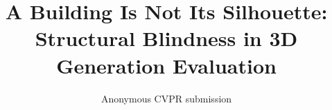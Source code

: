 \documentclass[10pt,twocolumn,letterpaper]{article}
\title{A Building Is Not Its Silhouette: Structural Blindness in 3D Generation Evaluation}
\author{Anonymous CVPR submission}
\begin{document}
\maketitlesupplementary

\appendix


{
    \small
    
    
}
\end{document}
